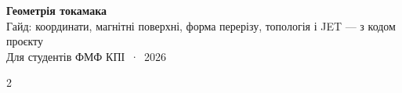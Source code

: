 

\thispagestyle{plain}
\begin{center}
{\LARGE\bfseries\sffamily Геометрія токамака}\\[3pt]
{\large\sffamily Гайд: координати, магнітні поверхні, форма перерізу, топологія і JET --- з кодом проєкту}\\[2pt]
{\small Для студентів ФМФ КПІ \,·\, 2026}
\end{center}
\vspace{-1.5em}
{\footnotesize\renewcommand{\cftchapfont}{\bfseries\footnotesize}\renewcommand{\cftchappagefont}{\bfseries\footnotesize}
\renewcommand{\cftsecfont}{\footnotesize}\renewcommand{\cftsecpagefont}{\footnotesize}
\begin{multicols}{2}
\tableofcontents
\end{multicols}}







\appendix




